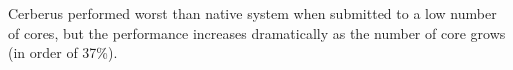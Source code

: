 \documentclass[journal]{IEEEtran}
\begin{document}
\begin{itemize}
\begin{itemize}
	Cerberus performed worst than native system when submitted to a low number of cores, but the performance increases dramatically as the number of core grows (in order of 37\%).

	\end{itemize}	
\end{itemize}


\end{document}
